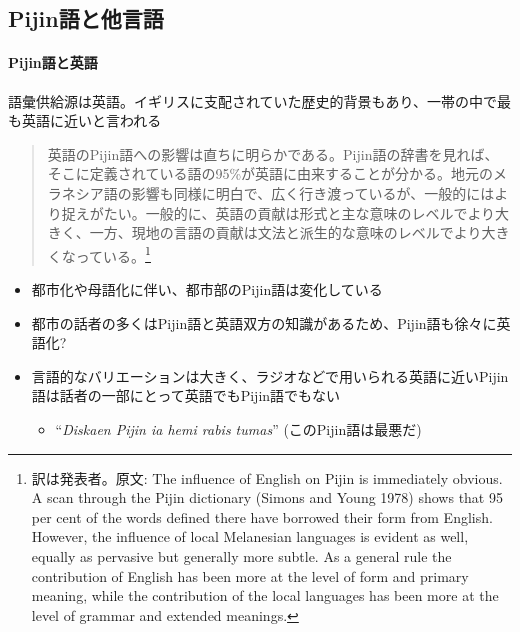 \documentclass[11pt,a4paper]{jsarticle}
\begin{document}
\subsection{Pijin語と他言語}
\paragraph{Pijin語と英語} 語彙供給源は英語。イギリスに支配されていた歴史的背景もあり、一帯の中で最も英語に近いと言われる

\begin{quotation}
  英語のPijin語への影響は直ちに明らかである。Pijin語の辞書\citep{yumi}を見れば、そこに定義されている語の95\%が英語に由来することが分かる。地元のメラネシア語の影響も同様に明白で、広く行き渡っているが、一般的にはより捉えがたい。一般的に、英語の貢献は形式と主な意味のレベルでより大きく、一方、現地の言語の貢献は文法と派生的な意味のレベルでより大きくなっている。\citep{malaitan}\footnote{訳は発表者。原文: The influence of English on Pijin is immediately obvious. A scan through the Pijin dictionary (Simons and Young 1978) shows that 95 per cent of the words defined there have borrowed their form from English. However, the influence of local Melanesian languages is evident as well, equally as pervasive but generally more subtle. As a general rule the contribution of English has been more at the level of form and primary meaning, while the contribution of the local languages has been more at the level of grammar and extended meanings.}
\end{quotation}
\cite{nativization}
\begin{itemize}
  \item 都市化や母語化に伴い、都市部のPijin語は変化している
  \item 都市の話者の多くはPijin語と英語双方の知識があるため、Pijin語も徐々に英語化?
  \item 言語的なバリエーションは大きく、ラジオなどで用いられる英語に近いPijin語は話者の一部にとって英語でもPijin語でもない
  \begin{itemize}
    \item ``\textit{Diskaen Pijin ia hemi rabis tumas}'' (このPijin語は最悪だ)
  \end{itemize}
\end{itemize}
\end{document}
